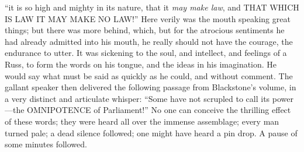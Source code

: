 ``it is so high and mighty in its nature, that it \emph{may
make law}, and THAT WHICH IS LAW IT MAY MAKE NO LAW!'' Here verily was the mouth speaking great
things; but there was more behind, which, but for the
atrocious sentiments he had already admitted into his
mouth, he really should not have the courage, the
endurance to utter. It was sickening to the soul, and
intellect, and feelings of a Russ, to form the words on
his tongue, and the ideas in his imagination. He would
say what must be said as quickly as he could, and without
comment. The gallant speaker then delivered the following
passage from Blackstone's volume, in a very distinct and
articulate whisper: ``Some have not scrupled to call
its power—the OMNIPOTENCE of Parliament!'' No
one can conceive the thrilling effect of these words;
they were heard all over the immense assemblage; every
man turned pale; a dead silence followed; one might have
heard a pin drop. A pause of some minutes followed.

